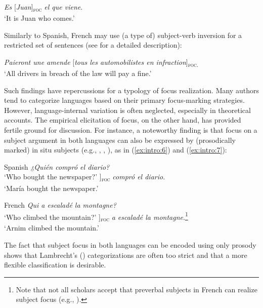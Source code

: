  \ea \label{ex:intro:4}
 \textit{Es} {[\textit{Juan}]}\textsubscript{\textsc{foc}} \normalsize \textit{el que viene}.\\
 `It is Juan who comes.' \hfill \parencite[8]{feldhausen2015oraciones}

 \z 
 

Similarly to Spanish, French may use (a type of) subject-verb inversion for a restricted set of sentences (see \cite{Lahousse2011} for a detailed description):

 \ea \label{ex:intro:5}
 \textit{Paieront une amende} {[\textit{tous les automobilistes en infraction}}]\textsubscript{\textsc{foc.}}\normalsize\\
 `All drivers in breach of the law will pay a fine.'  \\
 \hfill  \parencite[109]{marchello2008evolution}

 \z
 
Such findings have repercussions for a typology of focus realization. Many authors tend to categorize languages based on their primary focus-marking strategies. However, language-internal variation is often neglected, especially in theoretical accounts.
The empirical elicitation of focus, on the other hand, has provided fertile ground for discussion. For instance, a noteworthy finding is that focus on a subject argument in both languages can also be expressed by (prosodically marked) in situ subjects (e.g., \cite{gabriel2007fokus}, \cite{fery2001focus}, \cite{destruel2012french}), as in (\ref{ex:intro:6}) and (\ref{ex:intro:7}):

 \ea \label{ex:intro:6} Spanish
 \ea \textit{¿Quién compró el diario?}\\
 `Who bought the newspaper?'
 \ex  {[\textit{María}}]\textsubscript{\textsc{foc}} \normalsize \textit{compró el diario}.\\
 `María bought the newspaper.' \hfill \parencite[2]{gabriel2007fokus}   
  \z \z

 \ea \label{ex:intro:7} French
 \ea \textit{Qui a escaladé la montagne?}\\
 `Who climbed the mountain?'
 \ex  {[\textit{Arnim}}]\textsubscript{\textsc{foc}}
 \normalsize \textit{a escaladé la montagne}.\footnote{Note that not all scholars accept that preverbal subjects in French can realize subject focus (e.g., \cite{lambrecht1996information}).}\\
 `Arnim climbed the mountain.'  \hfill \parencite[10]{fery2001focus}   
\z \z
 

The fact that subject focus in both languages can be encoded using only pros\-o\-dy shows that Lambrecht's (\citeyear{lambrecht1996information}) categorizations are often too strict and that a more flexible classification is desirable.

